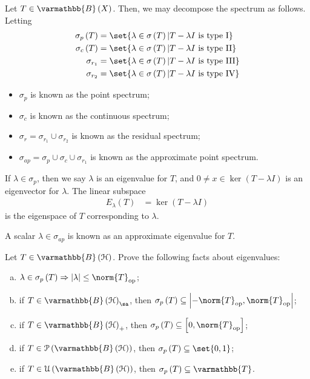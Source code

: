 \documentclass[10pt]{mypackage}
\renewcommand*{\mathbb}[1]{\varmathbb{#1}}
\newcommand{\B}{\mathbb{B}}
\begin{document}
\begin{definition}
  Let $T\in \B\left(X\right)$. Then, we may decompose the spectrum as follows. Letting
  \begin{align*}
    \sigma_p\left(T\right) &= \set{\lambda\in \sigma\left(T\right) | T - \lambda I\text{ is type I}}\\
    \sigma_{c}\left(T\right) &= \set{\lambda\in \sigma\left(T\right) | T - \lambda I\text{ is type II}}\\
    \sigma_{r_1} &= \set{\lambda\in \sigma\left(T\right) | T - \lambda I\text{ is type III}}\\
    \sigma_{r_2} &= \set{\lambda\in \sigma\left(T\right) | T - \lambda I\text{ is type IV}}
  \end{align*}
  \begin{itemize}
    \item $\sigma_p$ is known as the point spectrum;
    \item $\sigma_{c}$ is known as the continuous spectrum;
    \item $\sigma_{r} = \sigma_{r_1}\cup \sigma_{r_2}$ is known as the residual spectrum;
    \item $\sigma_{ap} = \sigma_p \cup \sigma_c \cup \sigma_{r_1}$ is known as the approximate point spectrum.
  \end{itemize}
  If $\lambda \in \sigma_p$, then we say $\lambda$ is an eigenvalue for $T$, and $0\neq x\in \ker\left(T - \lambda I\right)$ is an eigenvector for $\lambda$. The linear subspace
  \begin{align*}
    E_{\lambda}\left(T\right) &= \ker\left(T - \lambda I\right)
  \end{align*}
  is the eigenspace of $T$ corresponding to $\lambda$.\newline

  A scalar $\lambda \in \sigma_{ap}$ is known as an approximate eigenvalue for $T$.
\end{definition}
\begin{exercise}
  Let $T\in \B\left(\mathcal{H}\right)$. Prove the following facts about eigenvalues:
  \begin{enumerate}[(a)]
    \item $\lambda\in \sigma_p\left(T\right) \Rightarrow \left\vert \lambda \right\vert \leq \norm{T}_{\text{op}}$;
    \item if $T\in \B\left(\mathcal{H}\right)_{\sa}$, then $\sigma_p\left(T\right) \subseteq \left\vert -\norm{T}_{\text{op}},\norm{T}_{\text{op}} \right\vert$;
    \item if $T\in \B\left(\mathcal{H}\right)_{+}$, then $\sigma_p\left(T\right)\subseteq \left[0,\norm{T}_{\text{op}}\right]$;
    \item if $T\in \mathcal{P}\left(\B\left(\mathcal{H}\right)\right)$, then $\sigma_p\left(T\right)\subseteq \set{0,1}$;
    \item if $T\in \mathcal{U}\left(\B\left(\mathcal{H}\right)\right)$, then $\sigma_p\left(T\right)\subseteq \mathbb{T}$.
  \end{enumerate}
\end{exercise}
\end{document}
